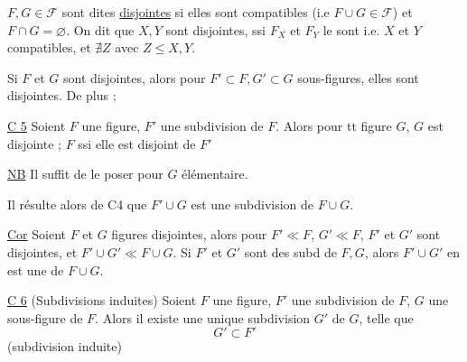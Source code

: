 
 $F,G\in\mathcal F$ sont dites \uline{disjointes} si elles sont compatibles (i.e $F\cup G\in\mathcal F$) et $F\cap G=\varnothing$. On dit que $X,Y$ sont disjointes, ssi $F_X$ et $F_Y$ le sont i.e. $X$ et $Y$ compatibles, et $\nexists Z$ avec $Z\leq X,Y$.

Si $F$ et $G$ sont disjointes, alors pour $F'\subset F,G'\subset G$ sous-figures, elles sont disjointes. De plus ;


 \margin{\deleted{[\uline{NB} $F'\cap G$ est défini comme, c'est $F'$ et $G$ \uline{compatibles} qui est en cause.}}


\uline{C 5} Soient $F$ une figure, $F'$ une subdivision de $F$. Alors pour tt figure $G$, $G$ est disjointe ; $F$ ssi elle est disjoint de $F'$

\uline{NB} Il suffit de le poser pour $G$ élémentaire.

Il résulte alors de  C4 que $F'\cup G$ est une subdivision de $F\cup G$.

\uline{Cor} Soient $F$ et $G$ figures disjointes, alors pour $F'\ll F$, $G'\ll F$, $F'$ et $G'$ sont disjointes, et $F'\cup G'\ll F\cup G$. Si $F'$ et $G'$ sont des subd de $F,G$, alors $F'\cup G'$ en est une de $F\cup G$.

\uline{C 6} (Subdivisions induites) Soient $F$ une figure, $F'$ une subdivision de $F$, $G$ une sous-figure de $F$. Alors il existe une unique subdivision $G'$ de $G$, telle que
\[G'\subset F'\]
(subdivision induite) 

